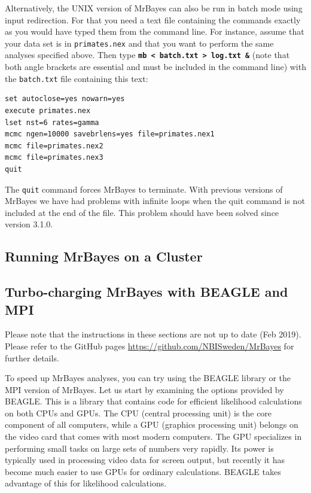 \documentclass[12pt]{book}
\newcommand{\ttt}[1]{\texttt{#1} }
\newcommand{\tb}[1]{\texttt{\textbf{#1}} }
\begin{document}
Alternatively, the UNIX version of MrBayes can also be run in batch mode using input redirection.
For that you need a text file containing the commands exactly as you would have typed them from the
command line. For instance, assume that your data set is in \ttt{primates.nex} and that you want to
perform the same analyses specified above. Then type \tb{mb < batch.txt > log.txt \&} (note that
both angle brackets are essential and must be included in the command line) with the
\ttt{batch.txt} file containing this text:

\begin{singlespacing}
\small
\begin{verbatim}
set autoclose=yes nowarn=yes
execute primates.nex
lset nst=6 rates=gamma
mcmc ngen=10000 savebrlens=yes file=primates.nex1
mcmc file=primates.nex2
mcmc file=primates.nex3
quit
\end{verbatim}
\normalsize
\end{singlespacing}

The \ttt{quit} command forces MrBayes to terminate. With previous versions of MrBayes we have had
problems with infinite loops when the quit command is not included at the end of the file. This
problem should have been solved since version 3.1.0.

\subsection{Running MrBayes on a Cluster}


\subsection{Turbo-charging MrBayes with BEAGLE and MPI}
\vspace{5 pt}
{\large Please note that the instructions in these sections are not up to date
(Feb 2019). Please refer to the GitHub pages \url{https://github.com/NBISweden/MrBayes}
for further details.}
\vspace{5 pt}

To speed up MrBayes analyses, you can try using the BEAGLE library or the MPI version of MrBayes.
Let us start by examining the options provided by BEAGLE. This is a library that contains code for
efficient likelihood calculations on both CPUs and GPUs. The CPU (central processing unit) is the
core component of all computers, while a GPU (graphics processing unit) belongs on the video card
that comes with most modern computers. The GPU specializes in performing small tasks on large sets
of numbers very rapidly.  Its power is typically used in processing video data for screen output,
but recently it has become much easier to use GPUs for ordinary calculations. BEAGLE takes
advantage of this for likelihood calculations.
\end{document}
